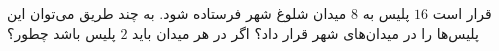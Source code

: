     \p 
قرار است
$16$
پلیس به
$8$
میدان شلوغ شهر فرستاده شود. به چند طریق می‌توان این پلیس‌ها را در میدان‌های شهر قرار داد؟ اگر در هر میدان باید
$2$
پلیس باشد چطور؟